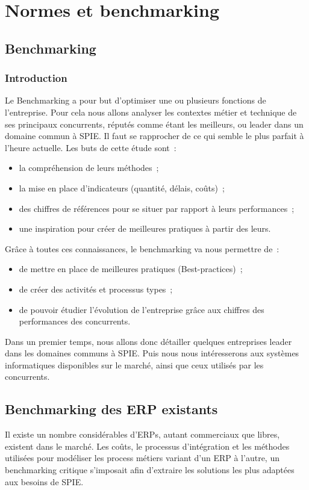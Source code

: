 \chapter{Normes et benchmarking}
\section{Benchmarking}
\subsection{Introduction}
	Le Benchmarking a pour but d'optimiser une ou plusieurs fonctions de l'entreprise. Pour cela nous allons analyser les contextes métier et technique de ses principaux concurrents, réputés comme étant les meilleurs, ou leader dans un domaine commun à SPIE. Il faut se rapprocher de ce qui semble le plus parfait à l'heure actuelle.
	Les buts de cette étude sont~:
\begin{itemize}
	\item la compréhension de leurs méthodes~;
	\item la mise en place d'indicateurs (quantité, délais, coûts)~;
	\item des chiffres de références pour se situer par rapport à leurs performances~;
	\item une inspiration pour créer de meilleures pratiques à partir des leurs.
\end{itemize}
\bigbreak
	Grâce à toutes ces connaissances, le benchmarking va nous permettre de~:
\begin{itemize}
	\item de mettre en place de meilleures pratiques (Best-practices)~;
	\item de créer des activités et processus types~;
	\item de pouvoir étudier l'évolution de l'entreprise grâce aux chiffres des performances des concurrents.
\end{itemize}
\bigbreak
	Dans un premier temps, nous allons donc détailler quelques entreprises leader dans les domaines communs à SPIE. Puis nous nous intéresserons aux systèmes informatiques disponibles sur le marché, ainsi que ceux utilisés par les concurrents.

    \section{Benchmarking des ERP existants}
		Il existe un nombre considérables d'ERPs, autant commerciaux que libres, existent dans le marché. Les coûts, le processus d'intégration et les méthodes utilisées pour modéliser les process métiers variant d'un ERP à l'autre, un benchmarking critique s'imposait afin d'extraire les solutions les plus adaptées aux besoins de SPIE.

